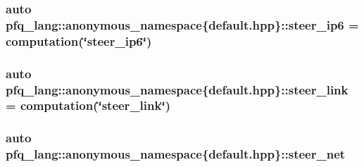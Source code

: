 \hypertarget{namespacepfq__lang_1_1anonymous__namespace_02default_8hpp_03_a011de504f63578469615a302f823d238}{
\subsubsection[{steer\-\_\-ip6}]{\setlength{\rightskip}{0pt plus 5cm}auto pfq\-\_\-lang\-::anonymous\-\_\-namespace\{default.\-hpp\}\-::steer\-\_\-ip6 = {\bf computation}(\char`\"{}steer\-\_\-ip6\char`\"{})}}\label{namespacepfq__lang_1_1anonymous__namespace_02default_8hpp_03_a011de504f63578469615a302f823d238}
\hypertarget{namespacepfq__lang_1_1anonymous__namespace_02default_8hpp_03_af339132b49ec24313a1b3d33cefb1628}{
\subsubsection[{steer\-\_\-link}]{\setlength{\rightskip}{0pt plus 5cm}auto pfq\-\_\-lang\-::anonymous\-\_\-namespace\{default.\-hpp\}\-::steer\-\_\-link = {\bf computation}(\char`\"{}steer\-\_\-link\char`\"{})}}\label{namespacepfq__lang_1_1anonymous__namespace_02default_8hpp_03_af339132b49ec24313a1b3d33cefb1628}
\hypertarget{namespacepfq__lang_1_1anonymous__namespace_02default_8hpp_03_a2c53e95204f3841919f780940b607d68}{
\subsubsection[{steer\-\_\-net}]{\setlength{\rightskip}{0pt plus 5cm}auto pfq\-\_\-lang\-::anonymous\-\_\-namespace\{default.\-hpp\}\-::steer\-\_\-net}}\label{namespacepfq__lang_1_1anonymous__namespace_02default_8hpp_03_a2c53e95204f3841919f780940b607d68}
